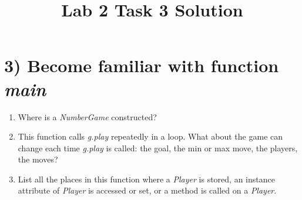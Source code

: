 \documentclass[12pt]{article}
\begin{document}
\title{Lab 2 Task 3 Solution}
\date{}
\maketitle


\section*{3) Become familiar with function \textit{main}}
\begin{enumerate}[1.]
    \item Where is a \textit{NumberGame} constructed?
    \item This function calls \textit{g.play} repeatedly in a loop. What about the
    game can change each time \textit{g.play} is called: the goal, the min or max
    move, the players, the moves?
    \item List all the places in this function where a \textit{Player} is stored,
    an instance attribute of \textit{Player} is accessed or set, or a method is
    called on a \textit{Player}.
\end{enumerate}
\end{document}
